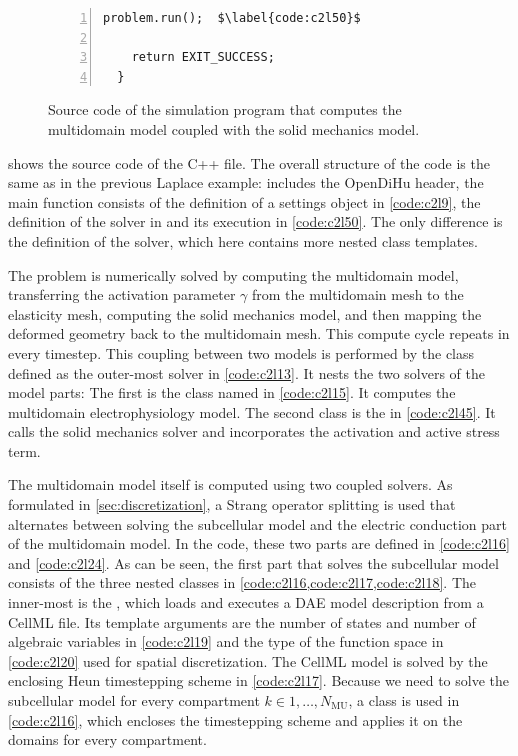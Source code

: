 \begin{figure}
\begin{framed}
\begin{lstlisting}[basicstyle=\scriptsize\ttfamily,commentstyle=\color{gray},numbers=left]
    problem.run();  $\label{code:c2l50}$
    
    return EXIT_SUCCESS;
  }
\end{lstlisting}
\end{framed}
\caption{Source code of the simulation program that computes the multidomain model coupled with the solid mechanics model.}%
\label{fig:example_multidomain_source}%
\end{figure}

 shows the source code of the C++ file. The overall structure of the code is the same as in the previous Laplace example:  includes the OpenDiHu header, the main function consists of the definition of a settings object in \cref{code:c2l9}, the definition of the solver in  and its execution in \cref{code:c2l50}. The only difference is the definition of the solver, which here contains more nested class templates.

The problem is numerically solved by computing the multidomain model, transferring the activation parameter $\gamma$ from the multidomain mesh to the elasticity mesh, computing the solid mechanics model, and then mapping the deformed geometry back to the multidomain mesh. This compute cycle repeats in every timestep. This coupling between two models is performed by the  class defined as the outer-most solver in \cref{code:c2l13}. It nests the two solvers of the model parts: The first is the class named  in \cref{code:c2l15}. It computes the multidomain electrophysiology model. The second class is the  in \cref{code:c2l45}. It calls the solid mechanics solver and incorporates the activation and active stress term.

The multidomain model itself is computed using two coupled solvers. As formulated in \cref{sec:discretization}, a Strang operator splitting is used that alternates between solving the subcellular model and the electric conduction part of the multidomain model. In the code, these two parts are defined in \cref{code:c2l16} and \cref{code:c2l24}. As can be seen, the first part that solves the subcellular model consists of the three nested classes in \cref{code:c2l16,code:c2l17,code:c2l18}. The inner-most is the , which loads and executes a DAE model description from a CellML file. Its template arguments are the number of states and number of algebraic variables in \cref{code:c2l19} and the type of the function space in \cref{code:c2l20} used for spatial discretization.
The CellML model is solved by the enclosing Heun timestepping scheme in \cref{code:c2l17}. Because we need to solve the subcellular model for every compartment $k \in 1,\dots,N_\text{MU}$, a  class is used in \cref{code:c2l16}, which encloses the timestepping scheme and applies it on the domains for every compartment.

